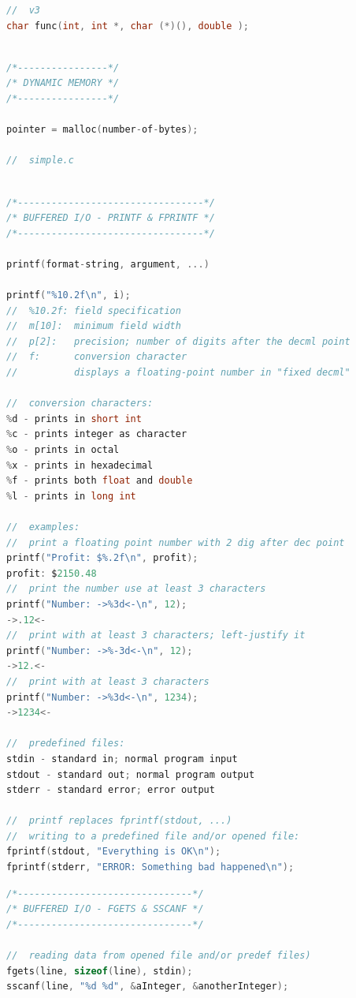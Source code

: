 \documentclass[8pt]{extarticle}
\begin{document}
\begin{small}
\begin{multicols}{2}
\begin{lstlisting}[language=C]
//  v3
char func(int, int *, char (*)(), double );
	
\end{lstlisting}

\begin{lstlisting}[language=C]
/*----------------*/
/* DYNAMIC MEMORY */
/*----------------*/

pointer = malloc(number-of-bytes);

//  simple.c



\end{lstlisting}

\begin{lstlisting}[language=C]
/*---------------------------------*/
/* BUFFERED I/O - PRINTF & FPRINTF */
/*---------------------------------*/

printf(format-string, argument, ...)

printf("%10.2f\n", i);
//  %10.2f: field specification
//  m[10]: 	minimum field width
//  p[2]: 	precision; number of digits after the decml point
//  f: 		conversion character
//	   		displays a floating-point number in "fixed decml"

//  conversion characters:
%d - prints in short int
%c - prints integer as character
%o - prints in octal
%x - prints in hexadecimal
%f - prints both float and double
%l - prints in long int

//  examples:
//  print a floating point number with 2 dig after dec point
printf("Profit: $%.2f\n", profit);
profit: $2150.48
//  print the number use at least 3 characters
printf("Number: ->%3d<-\n", 12);
->.12<-
//  print with at least 3 characters; left-justify it
printf("Number: ->%-3d<-\n", 12);
->12.<-
//  print with at least 3 characters
printf("Number: ->%3d<-\n", 1234);
->1234<-

//  predefined files:
stdin - standard in; normal program input
stdout - standard out; normal program output
stderr - standard error; error output

//  printf replaces fprintf(stdout, ...)
//  writing to a predefined file and/or opened file:
fprintf(stdout, "Everything is OK\n");
fprintf(stderr, "ERROR: Something bad happened\n");
\end{lstlisting}

\begin{lstlisting}[language=C]
/*-------------------------------*/
/* BUFFERED I/O - FGETS & SSCANF */
/*-------------------------------*/

//  reading data from opened file and/or predef files)
fgets(line, sizeof(line), stdin);
sscanf(line, "%d %d", &aInteger, &anotherInteger);


\end{lstlisting}
\end{multicols}
\end{small}
\end{document}
